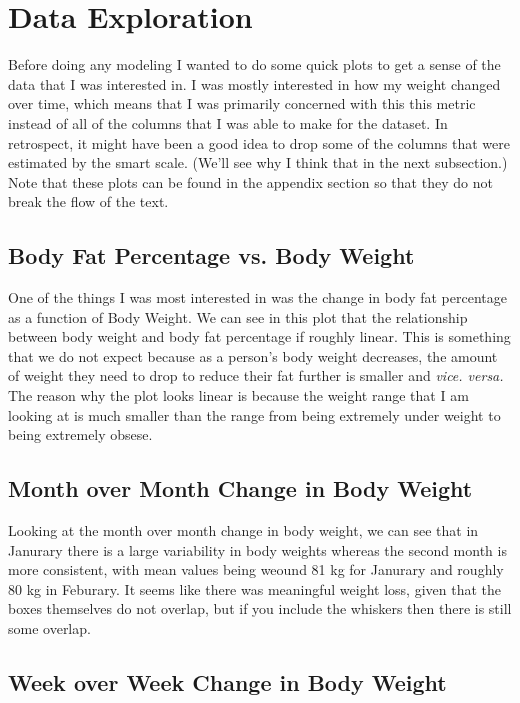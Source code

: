 \documentclass[journal, a4paper]{IEEEtran}
\begin{document}
\section{Data Exploration}

Before doing any modeling I wanted to do some quick plots to get a sense of the data that I was interested in. I was mostly interested in how my weight changed
over time, which means that I was primarily concerned with this this metric instead of all of the columns that I was able to make for the dataset. In 
retrospect, it might have been a good idea to drop some of the columns that were estimated by the smart scale. (We'll see why I think that in the next
subsection.)\\

Note that these plots can be found in the appendix section so that they do not break the flow of the text.

\subsection{Body Fat Percentage vs. Body Weight}

One of the things I was most interested in was the change in body fat percentage as a function of Body Weight. We can see in this plot that the relationship 
between body weight and body fat percentage if roughly linear. This is something that we do not expect because  as a person's body weight decreases, the amount 
of weight they need to drop to reduce their fat further is smaller and \textit{vice. versa.} The reason why the plot looks linear is because the weight range
that I am looking at is much smaller than the range from being extremely under weight to being extremely obsese. 

\subsection{Month over Month Change in Body Weight}

Looking at the month over month change in body weight, we can see that in Janurary there is a large variability in body weights whereas the second month
is more consistent, with mean values being weound 81 kg for Janurary and roughly 80 kg in Feburary. It seems like there was meaningful weight loss, given that 
the boxes themselves do not overlap, but if you include the whiskers then there is still some overlap.

\subsection{Week over Week Change in Body Weight}
\end{document}

